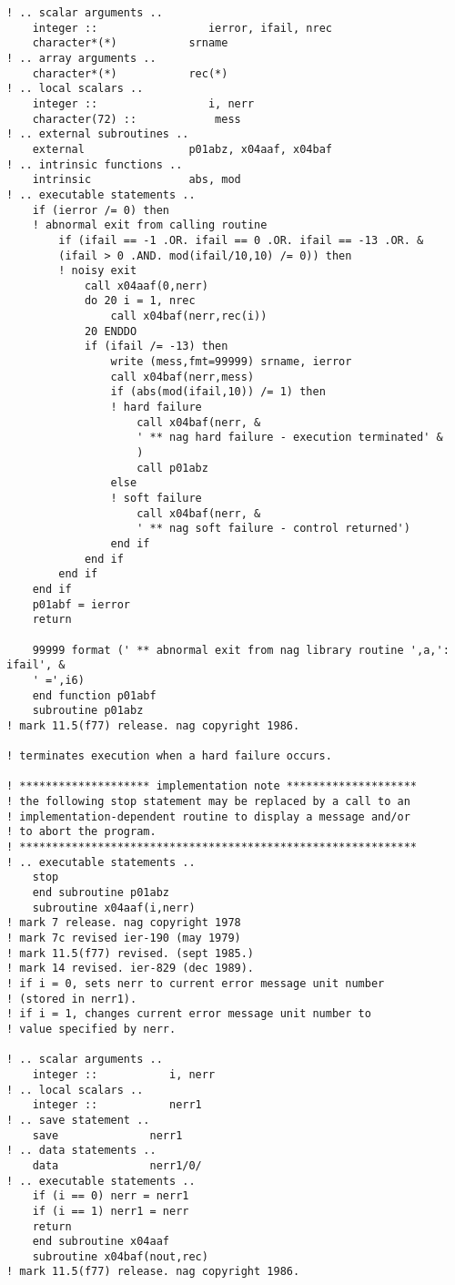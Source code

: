 \documentclass[12pt]{article}
\begin{document}
\begin{lstlisting}[frame=single,caption={{\tt d01b.f90}},label=d01b]
! .. scalar arguments ..
    integer ::                 ierror, ifail, nrec
    character*(*)           srname
! .. array arguments ..
    character*(*)           rec(*)
! .. local scalars ..
    integer ::                 i, nerr
    character(72) ::            mess
! .. external subroutines ..
    external                p01abz, x04aaf, x04baf
! .. intrinsic functions ..
    intrinsic               abs, mod
! .. executable statements ..
    if (ierror /= 0) then
    ! abnormal exit from calling routine
        if (ifail == -1 .OR. ifail == 0 .OR. ifail == -13 .OR. &
        (ifail > 0 .AND. mod(ifail/10,10) /= 0)) then
        ! noisy exit
            call x04aaf(0,nerr)
            do 20 i = 1, nrec
                call x04baf(nerr,rec(i))
            20 ENDDO
            if (ifail /= -13) then
                write (mess,fmt=99999) srname, ierror
                call x04baf(nerr,mess)
                if (abs(mod(ifail,10)) /= 1) then
                ! hard failure
                    call x04baf(nerr, &
                    ' ** nag hard failure - execution terminated' &
                    )
                    call p01abz
                else
                ! soft failure
                    call x04baf(nerr, &
                    ' ** nag soft failure - control returned')
                end if
            end if
        end if
    end if
    p01abf = ierror
    return

    99999 format (' ** abnormal exit from nag library routine ',a,': ifail', &
    ' =',i6)
    end function p01abf
    subroutine p01abz
! mark 11.5(f77) release. nag copyright 1986.

! terminates execution when a hard failure occurs.

! ******************** implementation note ********************
! the following stop statement may be replaced by a call to an
! implementation-dependent routine to display a message and/or
! to abort the program.
! *************************************************************
! .. executable statements ..
    stop
    end subroutine p01abz
    subroutine x04aaf(i,nerr)
! mark 7 release. nag copyright 1978
! mark 7c revised ier-190 (may 1979)
! mark 11.5(f77) revised. (sept 1985.)
! mark 14 revised. ier-829 (dec 1989).
! if i = 0, sets nerr to current error message unit number
! (stored in nerr1).
! if i = 1, changes current error message unit number to
! value specified by nerr.

! .. scalar arguments ..
    integer ::           i, nerr
! .. local scalars ..
    integer ::           nerr1
! .. save statement ..
    save              nerr1
! .. data statements ..
    data              nerr1/0/
! .. executable statements ..
    if (i == 0) nerr = nerr1
    if (i == 1) nerr1 = nerr
    return
    end subroutine x04aaf
    subroutine x04baf(nout,rec)
! mark 11.5(f77) release. nag copyright 1986.


\end{lstlisting}
\end{document}
